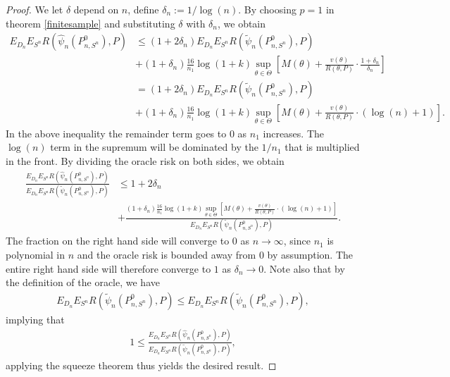 \documentclass[11pt, a4paper]{article}
\theoremstyle{definition}
\theoremstyle{remark}
\newcommand{\btheta}{\theta}
\newcommand{\la}{\psi}
\newcommand{\Sn}{S^n}
\begin{document}
\begin{proof}
    We let $ \delta $ depend on $ n $, define $ \delta_n := 1/\log(n) $.  By choosing $ p = 1 $ in theorem \ref{finitesample} and substituting $ \delta $ with $ \delta_n $, we obtain
    \begin{align*}
        E_{D_n} E_{\Sn} R(\hat{\la}_n(P_{n, \Sn}^{0}), P) &\leq(1 + 2 \delta_n) E_{D_n} E_{\Sn} R(\tilde{\la}_n(P_{n,\Sn}^{0}), P)\\
                                                        &+(1 + \delta_n) \frac{16}{n_1} \log (1 +k) \sup_{\btheta \in \Theta} \left[ M(\theta) + \frac{v(\theta)}{R(\theta, P)} \cdot \frac{1 + \delta_n}{\delta_n}  \right]\\
                                                        &= (1 + 2 \delta_n) E_{D_n} E_{\Sn} R(\tilde{\la}_n(P_{n,\Sn}^{0}), P)\\
                                                        &+(1 + \delta_n) \frac{16}{n_1} \log (1 +k) \sup_{\btheta \in \Theta} \left[ M(\theta) + \frac{v(\theta)}{R(\theta, P)} \cdot (\log(n) + 1) \right].
    \end{align*}
    In the above inequality the remainder term goes to $ 0 $ as $ n_1 $ increases. The $ \log(n) $ term in the supremum will be dominated by the $ 1/n_1 $ that is multiplied in the front. By dividing the oracle risk on both sides, we obtain
    \begin{align*}
        \frac{E_{D_n} E_{\Sn} R(\hat{\la}_n(P_{n, \Sn}^{0}), P)}{E_{D_n} E_{\Sn} R(\tilde{\la}_n(P_{n,\Sn}^{0}), P)} 
        &\leq 1 + 2 \delta_n\\
        &+\frac{(1 + \delta_n)\frac{16}{n_1} \log (1 +k) \sup_{\btheta \in \Theta} \left[ M(\theta) + \frac{v(\theta)}{R(\theta , P)} \cdot (\log(n) + 1) \right]}{E_{D_n} E_{\Sn} R( \tilde{\la}_n(P_{n,\Sn}^{0}), P)}.
    \end{align*}
    The fraction on the right hand side will converge to $ 0 $ as $ n \to \infty $, since $ n_1 $ is polynomial in $ n $ and the oracle risk is bounded away from $ 0 $ by assumption. The entire right hand side will therefore converge to $ 1 $ as $ \delta_n \to 0 $. Note also that by the definition of the oracle, we have 
    \begin{align*}
        E_{D_n} E_{\Sn} R(\tilde{\la}_n(P_{n,\Sn}^{0}), P) \leq E_{D_n} E_{\Sn} R(\tilde{\la}_n(P_{n,\Sn}^{0}), P),
    \end{align*}
    implying that 
        \begin{align*}
            1 \leq \frac{E_{D_n} E_{\Sn} R(\hat{\la}_n(P_{n, \Sn}^{0}), P)}{E_{D_n} E_{\Sn} R(\tilde{\la}_n(P_{n,\Sn}^{0}), P)}, 
    \end{align*}
    applying the squeeze theorem thus yields the desired result.         
\end{proof}
\end{document}
